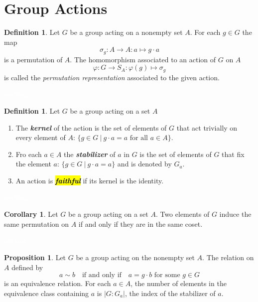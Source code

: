 \documentclass{article}
\theoremstyle{definition}
\newtheorem{prop}[thm]{Proposition}
\newtheorem{cor}[thm]{Corollary}
\newtheorem{defn}[thm]{Definition}
\newcommand{\nl}{\textcolor{white}{nothing}}
\newcommand{\ra}{\rightarrow}
\newcommand{\vphi}{\varphi}
\begin{document}

\section{Group Actions}

\setcounter{thm}{0}

\begin{defn}
Let $G$ be a group acting on a nonempty set $A$. For each $g\in G$ the map 
\[\sigma_g:A\ra A:a\mapsto g\cdot a\]
is a permutation of $A$. The homomorphism associated to an action of $G$ on $A$
\[\vphi: G\ra S_A:\vphi(g)\mapsto\sigma_g\]
is called the \textit{permutation representation} associated to the given action.
\end{defn}

\nl

\begin{defn}
Let $G$ be a group acting on a set $A$
\begin{enumerate}
\item The \textbf{\textit{kernel}} of the action is the set of elements of $G$ that act trivially on every element of $A$: $\{g\in G\ |\ g\cdot a = a\text{ for all }a\in A\}$.
\item Fro each $a\in A$ the \textbf{\textit{stabilizer}} of $a$ in $G$ is the set of elements of $G$ that fix the element $a$: $\{g\in G\ |\ g\cdot a =a\}$ and is denoted by $G_a$.
\item An action is \hl{\textbf{\textit{faithful}}} if its kernel is the identity.
\end{enumerate}
\end{defn}

\nl

\begin{cor}
Let $G$ be a group acting on a set $A$. Two elements of $G$ induce the same permutation on $A$ if and only if they are in the same coset.
\end{cor}

\nl

\begin{prop}
Let $G$ be a group acting on the nonempty set $A$. The relation on $A$ defined by
\[a\sim b\quad\text{if and only if}\quad a = g\cdot b\text{ for some } g\in G\]
is an equivalence relation. For each $a\in A$, the number of elements in the equivalence class containing $a$ is $|G:G_a|$, the index of the stabilizer of $a$.
\end{prop}
\end{document}

